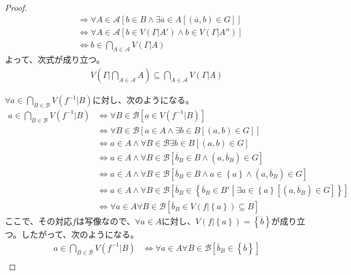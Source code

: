 \documentclass[a4paper]{jsarticle}
\begin{document}
\begin{proof}
\begin{align*}
&\Rightarrow \forall A \in \mathcal{A}\left[ b \in B \land \exists\overline{a} \in A\left[ \left( \overline{a},b \right) \in G \right] \right]\\
&\Leftrightarrow \forall A \in \mathcal{A}\left[ b \in V\left( \varGamma|A' \right) \land b \in V\left( \varGamma|A'' \right) \right]\\
&\Leftrightarrow b \in \bigcap_{A \in \mathcal{A}} {V\left( \varGamma|A \right)}
\end{align*}
よって、次式が成り立つ。
\begin{align*}
V\left( \varGamma|\bigcap_{A \in \mathcal{A}} A \right) \subseteq \bigcap_{A \in \mathcal{A}} {V\left( \varGamma|A \right)}
\end{align*}\par 
$\forall a \in \bigcap_{B\in \mathcal{B}} {V\left( f^{- 1}|B \right)} $に対し、次のようになる。
\begin{align*}
a \in \bigcap_{B\in \mathcal{B}} {V\left( f^{- 1}|B \right)} &\Leftrightarrow \forall B\in \mathcal{B}\left[ a \in V\left( f^{- 1}|B \right) \right]\\
&\Leftrightarrow \forall B\in \mathcal{B}\left[ a \in A \land \exists b \in B\left[ (a,b) \in G \right] \right]\\
&\Leftrightarrow a \in A \land \forall B\in \mathcal{B\exists}b \in B\left[ (a,b) \in G \right]\\
&\Leftrightarrow a \in A \land \forall B\in \mathcal{B}\left[ {\overline{b}}_{B} \in B \land \left( a,{\overline{b}}_{B} \right) \in G \right]\\
&\Leftrightarrow a \in A \land \forall B\in \mathcal{B}\left[ {\overline{b}}_{B} \in B \land a \in \left\{ a \right\} \land \left( a,{\overline{b}}_{B} \right) \in G \right]\\
&\Leftrightarrow a \in A \land \forall B\in \mathcal{B}\left[ {\overline{b}}_{B} \in \left\{ {\overline{b}}_{B} \in B' \middle| \exists a \in \left\{ a \right\}\left[ \left( a,{\overline{b}}_{B} \right) \in G \right] \right\} \right]\\
&\Leftrightarrow \forall a \in A\forall B\in \mathcal{B}\left[ {\overline{b}}_{B} \in V\left( f|\left\{ a \right\} \right) \subseteq B \right]
\end{align*}
ここで、その対応$f$は写像なので、$\forall a \in A$に対し、$V\left( f|\left\{ a \right\} \right) = \left\{ \overline{b} \right\}$が成り立つ。したがって、次のようになる。
\begin{align*}
a \in \bigcap_{B\in \mathcal{B}} {V\left( f^{- 1}|B \right)} &\Leftrightarrow \forall a \in A\forall B\in \mathcal{B}\left[ {\overline{b}}_{B} \in \left\{ \overline{b} \right\} \right]\\

\end{align*}
\end{proof}
\end{document}
